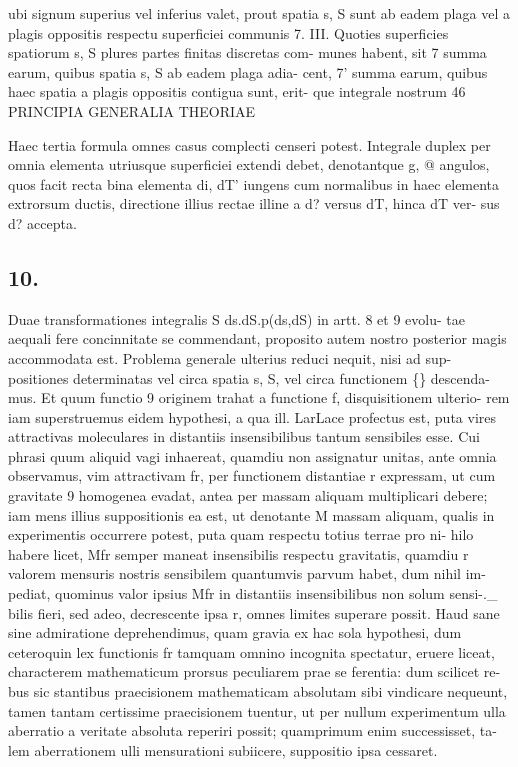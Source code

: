 \documentclass[12pt,a4paper]{article}
\begin{document}
ubi signum superius vel inferius valet, prout spatia s, S sunt ab eadem plaga
vel a plagis oppositis respectu superficiei communis           7.
III.    Quoties superficies spatiorum s, S plures partes finitas discretas com-
munes     habent, sit 7 summa earum, quibus spatia              s, S ab eadem plaga adia-
cent, 7' summa earum, quibus haec spatia a plagis oppositis contigua sunt, erit-
que integrale nostrum
46                           PRINCIPIA   GENERALIA   THEORIAE




Haec tertia formula omnes casus complecti censeri potest.            Integrale duplex per
omnia elementa     utriusque superficiei extendi debet, denotantque          g, @ angulos,
quos facit recta bina elementa di, dT' iungens cum normalibus in haec elementa
extrorsum ductis, directione illius rectae illine a d? versus dT, hinca dT ver-
sus d? accepta.



\subsection*{10.}


Duae transformationes integralis S ds.dS.p(ds,dS)             in artt. 8 et 9 evolu-
tae aequali fere concinnitate se commendant,           proposito autem nostro posterior
magis accommodata est. Problema generale ulterius reduci nequit, nisi ad sup-
positiones determinatas vel circa spatia s, S, vel circa functionem \guillemotright\{\} descenda-
mus.    Et quum functio 9 originem trahat a functione f, disquisitionem ulterio-
rem iam superstruemus eidem hypothesi, a qua ill. LarLace profectus est, puta
vires attractivas moleculares in distantiis insensibilibus tantum sensibiles esse.
Cui phrasi quum aliquid vagi inhaereat, quamdiu non assignatur unitas, ante
omnia observamus,     vim attractivam fr, per functionem distantiae r expressam,
ut cum gravitate    9 homogenea evadat, antea per massam aliquam multiplicari
debere; iam mens illius suppositionis ea est, ut denotante M massam aliquam,
qualis in experimentis occurrere potest, puta quam respectu totius terrae pro ni-
hilo habere licet, Mfr     semper maneat insensibilis respectu gravitatis, quamdiu
r valorem mensuris nostris sensibilem quantumvis parvum habet, dum nihil im-
pediat, quominus valor ipsius Mfr in distantiis insensibilibus non solum sensi-.\_
bilis fieri, sed adeo, decrescente ipsa r,     omnes    limites   superare   possit.   Haud
sane sine admiratione deprehendimus, quam gravia ex hac sola hypothesi, dum
ceteroquin lex functionis fr tamquam omnino incognita spectatur, eruere liceat,
characterem mathematicum prorsus peculiarem prae se ferentia: dum scilicet re-
bus sic stantibus praecisionem mathematicam absolutam sibi vindicare nequeunt,
tamen tantam certissime praecisionem tuentur, ut per nullum experimentum ulla
aberratio a veritate absoluta reperiri possit; quamprimum enim successisset, ta-
lem aberrationem ulli mensurationi subiicere, suppositio ipsa cessaret.
\end{document}
